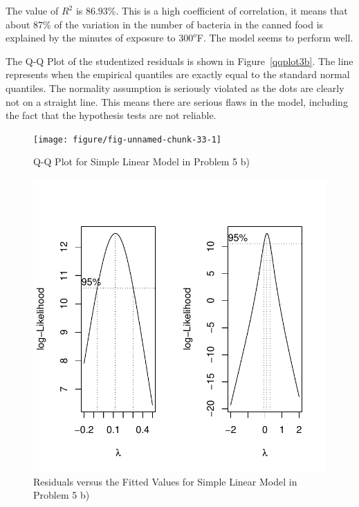 \begin{solution}{2.22}
\begin{enumerate}
The value of $R^{2}$ is $86.93\%$. This is a high coefficient of correlation, it means that about 87\% of the variation in the number of bacteria in the canned food is explained by the minutes of exposure to $300^{o}$F. The model seems to perform well.

The Q-Q Plot of the studentized residuals is shown in Figure~\ref{qqplot3b}. The line represents when the empirical quantiles are exactly equal to the standard normal quantiles. The normality assumption is seriously violated as the dots are clearly not on a straight line. This means there are serious flaws in the model, including the fact that the hypothesis tests are not reliable.

\begin{figure}
\begin{center}
\begin{knitrout}
\color{fgcolor}

{\centering \texttt{[image: figure/fig-unnamed-chunk-33-1]}

}



\end{knitrout}
\end{center}
\caption{Q-Q Plot for Simple Linear Model in Problem 5 b)}
\label{fig:simple:bact2}
\end{figure}

\begin{figure}
\begin{center}
\begin{knitrout}
\color{fgcolor}

{\centering \includegraphics[width=.45\linewidth]{figure/fig-unnamed-chunk-34-1}

}



\end{knitrout}
\end{center}
\caption{Residuals versus the Fitted Values for Simple Linear Model in Problem 5 b)} \label{fig:simple:bact3}
\end{figure}


\end{enumerate}
\end{solution}
